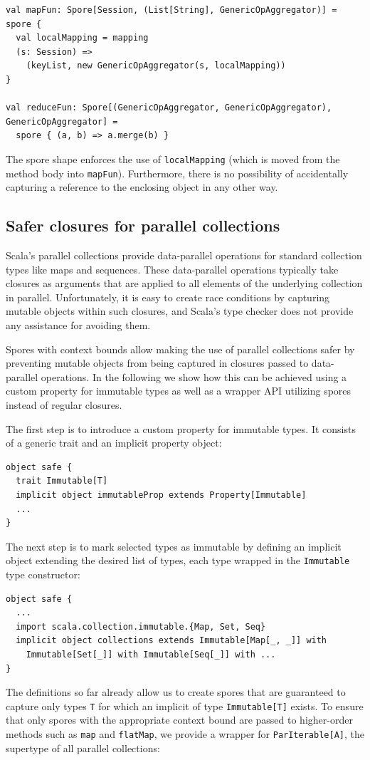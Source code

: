\documentclass{llncs}
\begin{document}
\begin{lstlisting}
val mapFun: Spore[Session, (List[String], GenericOpAggregator)] = spore {
  val localMapping = mapping
  (s: Session) =>
    (keyList, new GenericOpAggregator(s, localMapping))
}

val reduceFun: Spore[(GenericOpAggregator, GenericOpAggregator), GenericOpAggregator] =
  spore { (a, b) => a.merge(b) }
\end{lstlisting}
\noindent
The spore shape enforces the use of \verb|localMapping| (which is moved from the method body into \verb|mapFun|). Furthermore, there is no possibility of accidentally capturing a reference to the enclosing object in any other way.


\subsection{Safer closures for parallel collections}

Scala's parallel collections provide data-parallel operations for standard collection types like maps and sequences. These data-parallel operations typically take closures as arguments that are applied to all elements of the underlying collection in parallel. Unfortunately, it is easy to create race conditions by capturing mutable objects within such closures, and Scala's type checker does not provide any assistance for avoiding them.

Spores with context bounds allow making the use of parallel collections safer by preventing mutable objects from being captured in closures passed to data-parallel operations. In the following we show how this can be achieved using a custom property for immutable types as well as a wrapper API utilizing spores instead of regular closures.

The first step is to introduce a custom property for immutable types. It consists of a generic trait and an implicit property object:

\begin{verbatim}
object safe {
  trait Immutable[T]
  implicit object immutableProp extends Property[Immutable]
  ...
}
\end{verbatim}
\noindent
The next step is to mark selected types as immutable by defining an implicit object extending the desired list of types, each type wrapped in the \verb|Immutable| type constructor:

\begin{verbatim}
object safe {
  ...
  import scala.collection.immutable.{Map, Set, Seq}
  implicit object collections extends Immutable[Map[_, _]] with
    Immutable[Set[_]] with Immutable[Seq[_]] with ...
}
\end{verbatim}
\noindent
The definitions so far already allow us to create spores that are guaranteed to capture only types \verb|T| for which an implicit of type \verb|Immutable[T]| exists. To ensure that only spores with the appropriate context bound are passed to higher-order methods such as \verb|map| and \verb|flatMap|, we provide a wrapper for \verb|ParIterable[A]|, the supertype of all parallel collections:
\end{document}
